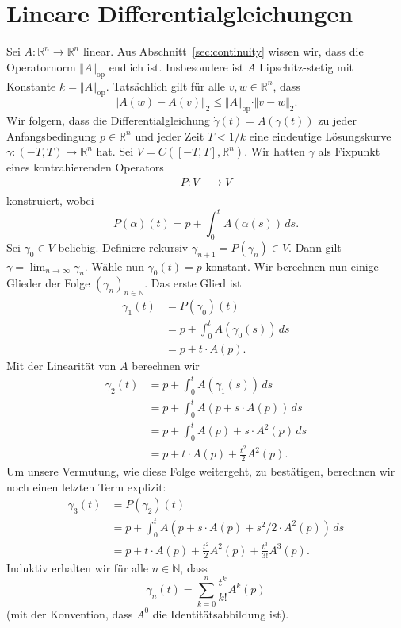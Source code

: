 \documentclass[../main.tex]{subfiles}
\begin{document}
\section{Lineare Differentialgleichungen}
Sei $A \colon \mathbb{R}^n \to \mathbb{R}^n$ linear.
Aus Abschnitt~\ref{sec:continuity}
wissen wir, dass die Operatornorm
$\Vert A \Vert_{\text{op}}$ endlich ist.
Insbesondere ist $A$ Lipschitz-stetig mit Konstante
$k = \Vert A \Vert_{\text{op}}$.
Tatsächlich gilt für alle $v, w \in \mathbb{R}^n$, dass
\[
  \Vert A(w) - A(v) \Vert_2 \leq \Vert A \Vert_{\text{op}} \cdot
  \Vert v - w \Vert_2.
\]
Wir folgern, dass die Differentialgleichung
$\dot \gamma(t) = A(\gamma(t))$ zu jeder
Anfangsbedingung $p \in \mathbb{R}^n$ 
und jeder Zeit $T < 1/k$ 
eine eindeutige Lösungskurve
$\gamma \colon (-T, T) \to \mathbb{R}^n$ hat.
Sei $V = C([-T, T], \mathbb{R}^n)$.
Wir hatten $\gamma$ als Fixpunkt eines kontrahierenden
Operators
\begin{align*}
  P \colon V & \to V \\
\end{align*}
konstruiert, wobei
\[
  P(\alpha)(t) = p + \int_{0}^{t} A(\alpha(s)) \, ds.
\]
Sei $\gamma_0 \in V$ beliebig. Definiere rekursiv
$\gamma_{n+1} = P(\gamma_n) \in V$.
Dann gilt $\gamma = \lim_{n \to \infty} \gamma_n$.
Wähle nun $\gamma_0(t) = p$ konstant.
Wir berechnen nun einige Glieder der Folge
${(\gamma_{n})}_{n \in \mathbb{N}}$.
Das erste Glied ist
\begin{align*}
  \gamma_1(t)  
  & = P(\gamma_0)(t) \\
  &= p + \int_{0}^{t} A(\gamma_0(s)) \, ds \\
  &= p + t \cdot A(p).
\end{align*}
Mit der Linearität von $A$ berechnen wir
\begin{align*}
  \gamma_2(t) 
  &= p + \int_{0}^{t} A(\gamma_1(s)) \, ds  \\
  &= p + \int_{0}^{t} A(p + s \cdot A(p)) \, ds \\
  &= p + \int_{0}^{t} A(p) + s \cdot A^2(p) \, ds \\
  &= p + t \cdot A(p) + \frac{t^2}{2}A^2(p).
\end{align*}
Um unsere Vermutung, wie diese Folge weitergeht,
zu bestätigen, berechnen wir noch einen letzten
Term explizit:
\begin{align*}
  \gamma_3(t)
  & = P(\gamma_2)(t)\\
  &= p + \int_{0}^{t} A(p + s \cdot A(p) + s^2 /2 \cdot A^2(p)) \, ds \\
  &= p + t \cdot A(p) + \frac{t^2}{2} A^2(p) + \frac{t^3}{3!} A^3(p).
\end{align*}
Induktiv erhalten wir für alle $n \in \mathbb{N}$, dass
\[
  \gamma_n(t)
  = \sum_{k=0}^{n} \frac{t^k}{k!} A^k(p)
\]
(mit der Konvention, dass $A^0$ die Identitätsabbildung ist).
\end{document}
